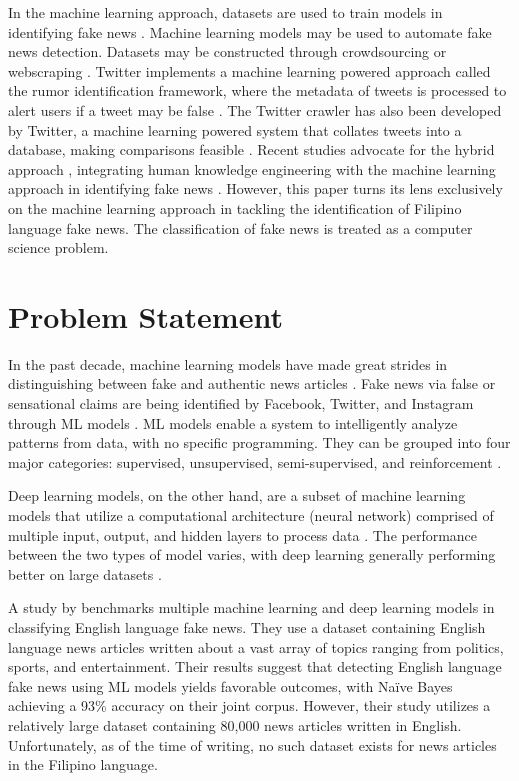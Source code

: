 In the machine learning approach, datasets are used to train models in identifying fake news \cite{debeer2020approaches}. Machine learning models may be used to automate fake news detection. Datasets may be constructed through crowdsourcing \cite{perezrosas2018automatic} or webscraping \cite{cruz2020localization}. Twitter implements a machine learning powered approach called the rumor identification framework, where the metadata of tweets is processed to alert users if a tweet may be false \cite{sivasangari2018modern}. The Twitter crawler has also been developed by Twitter, a machine learning powered system that collates tweets into a database, making comparisons feasible \cite{atodiresei2018identifying}. Recent studies advocate for the hybrid approach \cite{debeer2020approaches}, integrating human knowledge engineering with the machine learning approach in identifying fake news \cite{ruchansky2017csi, okoro2018hybrid}. However, this paper turns its lens exclusively on the machine learning approach in tackling the identification of Filipino language fake news. The classification of fake news is treated as a computer science problem.

\section{Problem Statement}

In the past decade, machine learning models have made
great strides in distinguishing between fake and authentic news articles \cite{ahmed2021detecting}. Fake news via false or sensational claims are being identified by Facebook, Twitter, and Instagram through ML models \cite{debeer2020approaches}. ML models enable a system to intelligently analyze patterns from data, with no specific programming. They can be grouped into four major categories: supervised, unsupervised, semi-supervised, and reinforcement \cite{sarker2021machine}.

Deep learning models, on the other hand, are a subset of machine learning models that utilize a computational architecture (neural network) comprised of multiple input, output, and hidden layers to process data \cite{sarker2021machine}. The performance between the two types of model varies, with deep learning generally performing better on large datasets \cite{xin2018machine, sarker2020cybersecurity}.

A study by  benchmarks multiple machine learning and deep learning models in classifying English language fake news. They use a dataset containing English language news articles written about a vast array of topics ranging from politics, sports, and entertainment. Their results suggest that detecting English language fake news using ML models yields favorable outcomes, with Naïve Bayes achieving a 93\% accuracy on their joint corpus. However, their study utilizes a relatively large dataset containing 80,000 news articles written in English. Unfortunately, as of the time of writing, no such dataset exists for news articles in the Filipino language.

